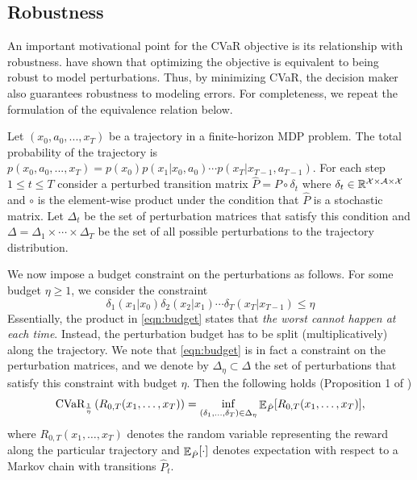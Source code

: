 \subsection{Robustness}

An important motivational point for the CVaR objective  is its relationship with robustness. \citet{chow2015risk} have shown that optimizing the objective is equivalent to being robust to model perturbations. Thus, by minimizing CVaR, the decision maker also guarantees robustness to modeling errors. For completeness, we repeat the formulation of the equivalence relation below.

Let $(x_0, a_0, ..., x_T)$ be a trajectory in a finite-horizon MDP problem. The total probability of the trajectory is $p(x_0, a_0, ..., x_T)=p(x_0)p(x_1|x_0,a_0)\cdots p(x_T|x_{T-1}, a_{T-1})$. For each step $1\le t\le T$ consider a perturbed transition matrix $\hat{P} = P \circ \delta_t$ where $\delta_t \in \mathbb{R}^{\mathcal{X}\times\mathcal{A}\times\mathcal{X}}$ and $\circ$ is the element-wise product under the condition that $\hat{P}$ is a stochastic matrix. Let $\Delta_t$ be the set of perturbation matrices that satisfy this condition and $\Delta = \Delta_1 \times \cdots \times \Delta_T$ be the set of all possible perturbations to the trajectory distribution.

We now impose a budget constraint on the perturbations as follows. For some budget $\eta \geq 1$, we consider the constraint
\begin{equation}\label{eqn:budget}
    \delta_1(x_1|x_0)\delta_2(x_2|x_1)\cdots \delta_T(x_T|x_{T-1}) \leq \eta
\end{equation}
Essentially, the product in \eqref{eqn:budget} states that \emph{the worst cannot happen at each time}. Instead, the perturbation budget has to be split (multiplicatively) along the trajectory. We note that \eqref{eqn:budget} is in fact a constraint on the perturbation matrices, and we denote by $\Delta_\eta \subset \Delta$ the set of perturbations that satisfy this constraint with budget $\eta$.
Then the following holds (Proposition 1 of \citep{chow2015risk})
\begin{equation}\label{eq:CVaR_is_robustness}
    \text{CVaR}_{\frac{1}{\eta}} \left(R_{0,T}(x_1,\dots,x_T)\right) = \inf_{(\delta_1,\dots,\delta_T)\in \Delta_{\eta}} \mathop{\mathbb{E}}\nolimits_{\hat{P}}[R_{0,T}(x_1,\dots,x_T)],
\end{equation}
where $R_{0,T}(x_1,\dots,x_T)$ denotes the random variable representing the reward along the particular trajectory and $\mathop{\mathbb{E}}\nolimits_{\hat{P}}[\cdot]$ denotes expectation with respect to a Markov chain with transitions $\hat{P}_t$.



